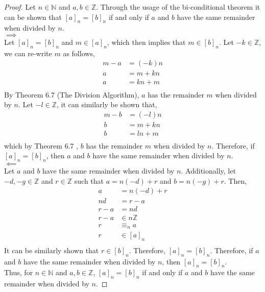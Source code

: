 \documentclass[12pt]{article}
\begin{document}
\begin{proof}
	Let $n \in \mathbb{N}$ and $a,b \in \mathbb{Z}$. Through the usage of the bi-conditional theorem
	it can be shown that $[a]_n = [b]_n$ if and only if $a$ and $b$ have the same remainder when divided by $n$.\\

	$\implies$\\
	Let $[a]_n = [b]_n$ and $m \in [a]_n$, which then implies that $m \in [b]_n$. Let $-k \in \mathbb{Z}$, we can re-write $m$ as follows,
	$$
	\begin{aligned}
		m - a &= (-k)n\\
		a &= m + kn\\
		a &= kn + m\\
	\end{aligned}
	$$
	By Theorem 6.7 (The Division Algorithm), $a$ has the remainder $m$ when divided by $n$. Let $-l \in \mathbb{Z}$, it can similarly be shown that,
	$$
	\begin{aligned}
		m - b &= (-l)n\\	
		b &= m + kn\\
		b &= ln + m\\
	\end{aligned}
	$$
	which by Theorem 6.7 , $b$ has the remainder $m$ when divided by $n$. Therefore, if $[a]_n = [b]_n$, then $a$ and $b$ have the same remainder when divided by $n$.\\

	$\impliedby$\\
	Let $a$ and $b$ have the same remainder when divided by $n$. Additionally, let 
	$-d, -g \in \mathbb{Z}$ and $r \in \mathbb{Z}$ such that $a = n(-d) + r$ and $b = n(-g) + r$. Then,
    $$
    \begin{aligned}
	    a &= n(-d) + r\\
	    nd &= r-a\\
	    r-a &= nd\\
	    r-a&\in n\mathbb{Z}\\
	    r &\equiv_n a\\
	    r &\in [a]_n\\
    \end{aligned}
    $$
    It can be similarly shown that $r \in [b]_n$. Therefore, $[a]_n = [b]_n$. Therefore, if $a$ and $b$ have the same remainder when divided by $n$, then $[a]_n = [b]_n$.\\

    Thus, for $n \in \mathbb{N}$ and $a,b \in \mathbb{Z}$, $[a]_n = [b]_n$ if and only if $a$ and $b$ have the same remainder when divided by $n$.
\end{proof}

 
 
\end{document}
